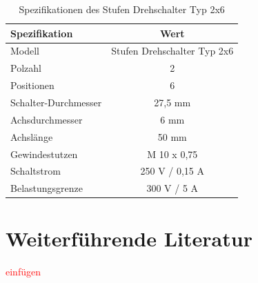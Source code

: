 \begin{table}[H]
	\centering
	\begin{tabular}{|l|c|}
		\hline
		\textbf{Spezifikation} & \textbf{Wert} \\
		\hline
		Modell & Stufen Drehschalter Typ 2x6 \\
		Polzahl & 2 \\
		Positionen & 6 \\
		Schalter-Durchmesser & 27,5 mm \\
		Achsdurchmesser & 6 mm \\
		Achslänge & 50 mm \\
		Gewindestutzen & M 10 x 0,75 \\
		Schaltstrom & 250 V / 0,15 A  \\
		Belastungsgrenze & 300 V / 5 A   \\
		\hline
	\end{tabular}
	\caption{Spezifikationen des Stufen Drehschalter Typ 2x6}
	\label{tab:SpezifikationStufenDrehschalter}
\end{table}


\section{Weiterführende Literatur}

\textcolor{red}{einfügen}

